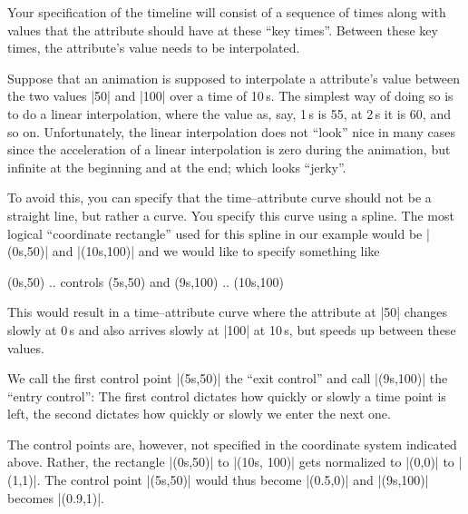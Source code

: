 Your specification of the timeline will consist of a sequence of times along
with values that the attribute should have at these ``key times''. Between
these key times, the attribute's value needs to be interpolated.

Suppose that an animation is supposed to interpolate a attribute's value
between the two values |50| and |100| over a time of 10\,s. The simplest way of
doing so is to do a linear interpolation, where the value as, say, 1\,s is 55,
at 2\,s it is 60, and so on. Unfortunately, the linear interpolation does not
``look'' nice in many cases since the acceleration of a linear interpolation is
zero  during the animation, but infinite at the beginning and at the end; which
looks ``jerky''.

To avoid this, you can specify that the time--attribute curve should not be a
straight line, but rather a curve. You specify this curve using a spline. The
most logical ``coordinate rectangle'' used for this spline in our example would
be |(0s,50)| and |(10s,100)| and we would like to specify something like
%
\begin{codeexample}
  (0s,50) .. controls (5s,50) and (9s,100) .. (10s,100)
\end{codeexample}
%
This would result in a time--attribute curve where the attribute at |50|
changes slowly at 0\,s and also arrives slowly at |100| at 10\,s, but speeds up
between these values.

We call the first control point |(5s,50)| the ``exit control'' and call
|(9s,100)| the ``entry control'': The first control dictates how quickly or
slowly a time point is left, the second dictates how quickly or slowly we enter
the next one.

The control points are, however, not specified in the coordinate system
indicated above. Rather, the rectangle |(0s,50)| to |(10s, 100)| gets
normalized to |(0,0)| to |(1,1)|. The control point |(5s,50)| would thus become
|(0.5,0)| and |(9s,100)| becomes |(0.9,1)|.

